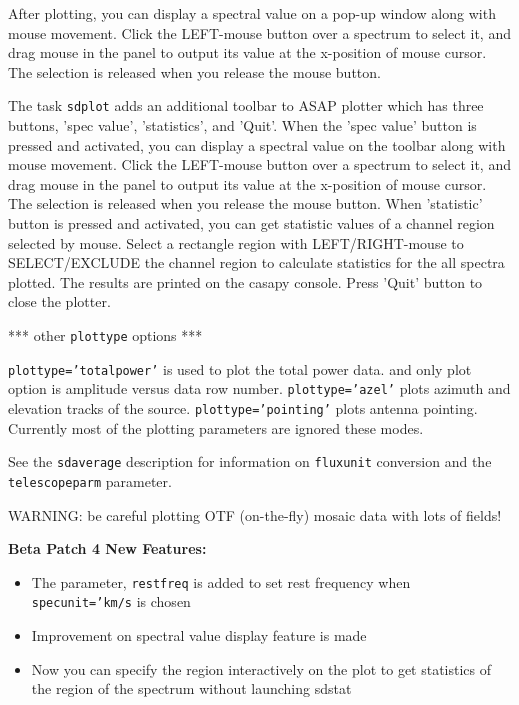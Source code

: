     After plotting, you can display a spectral value on a pop-up
    window along with mouse movement. Click the LEFT-mouse button
    over a spectrum to select it, and drag mouse in the panel to
    output its value at the x-position of mouse cursor. The selection
    is released when you release the mouse button.

    The task {\tt sdplot} adds an additional toolbar to ASAP plotter which
    has three buttons, 'spec value', 'statistics', and 'Quit'. 
    When the 'spec value' button is pressed and activated, you can 
    display a spectral value on the toolbar along with mouse
    movement. Click the LEFT-mouse button over a spectrum to select
    it, and drag mouse in the panel to output its value at the 
    x-position of mouse cursor. The selection is released when you
    release the mouse button. 
    When 'statistic' button is pressed and activated, you can get
    statistic values of a channel region selected by mouse. Select a
    rectangle region with LEFT/RIGHT-mouse to SELECT/EXCLUDE the
    channel region to calculate statistics for the all spectra
    plotted. The results are printed on the casapy console. 
    Press 'Quit' button to close the plotter. 

    *** other {\tt plottype} options ***

    {\tt plottype='totalpower'} is used to plot the total power data.
    and only plot option is amplitude versus data row number.
    {\tt plottype='azel'} plots azimuth and elevation tracks of the source.
    {\tt plottype='pointing'} plots antenna pointing.
    Currently most of the plotting parameters are ignored these modes.

    See the {\tt sdaverage} description for information on {\tt fluxunit} 
    conversion and the {\tt telescopeparm} parameter.

    WARNING: be careful plotting OTF (on-the-fly) mosaic data with 
    lots of fields!


    {\bf Beta Patch 4 New Features:}
    \begin{itemize}
    \item The parameter, {\tt restfreq} is added to set rest frequency when 
    {\tt specunit='km/s} is chosen
    \item Improvement on spectral value display feature is made 
    \item Now you can specify the region interactively on the plot to get 
          statistics of the region of the spectrum without launching sdstat 
    \end{itemize}

